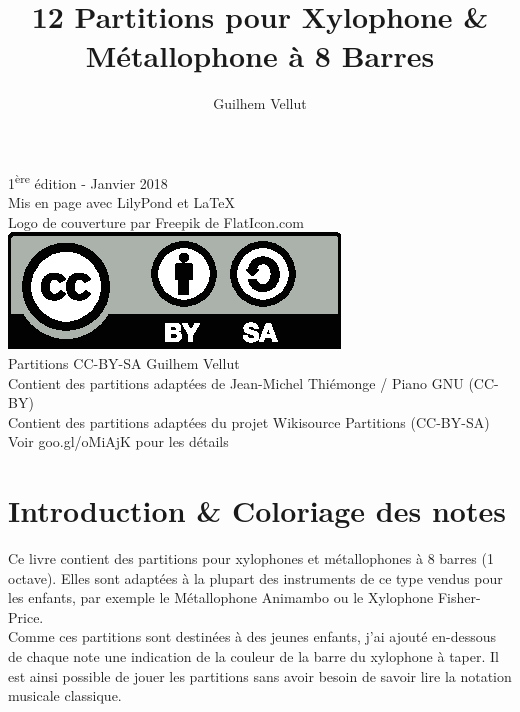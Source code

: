 \documentclass[17pt,letterpaper]{extarticle}
\title{12 Partitions pour Xylophone \& Métallophone à 8 Barres}
\author{Guilhem Vellut}
\date{}
\makeatletter
\def\clearleftpage{\clearpage\ifodd\c@page\else
\hbox{}\newpage\if@twocolumn\hbox{}\newpage\fi\fi}
\makeatother
\begin{document}
\pagestyle{empty}
\setcounter{secnumdepth}{-1}
\setcounter{page}{1}

\maketitle
\thispagestyle{empty}

\clearpage
\vspace*{\fill}

{\tiny 1\textsuperscript{ère} édition - Janvier 2018 \\ Mis en page avec LilyPond et \LaTeX \\
Logo de couverture par Freepik de FlatIcon.com\\
\newline
\includegraphics{by-sa} \\
\newline
Partitions CC-BY-SA Guilhem Vellut\\
Contient des partitions adaptées de Jean-Michel Thiémonge / Piano GNU (CC-BY)\\
Contient des partitions adaptées du projet Wikisource Partitions (CC-BY-SA)\\
Voir goo.gl/oMiAjK pour les détails \par}

\clearpage

\tableofcontents
\thispagestyle{empty}

\clearleftpage
\pagestyle{plain} 

\section{Introduction \& Coloriage des notes}

Ce livre contient des partitions pour xylophones et métallophones à 8 barres (1 octave). Elles sont adaptées à la plupart des instruments de ce type vendus pour les enfants, par exemple le Métallophone Animambo ou le Xylophone Fisher-Price.\\

Comme ces partitions sont destinées à des jeunes enfants, j'ai ajouté en-dessous de chaque note une indication de la couleur de la barre du xylophone à taper. Il est ainsi possible de jouer les partitions sans avoir besoin de savoir lire la notation musicale classique.\\
\end{document}
